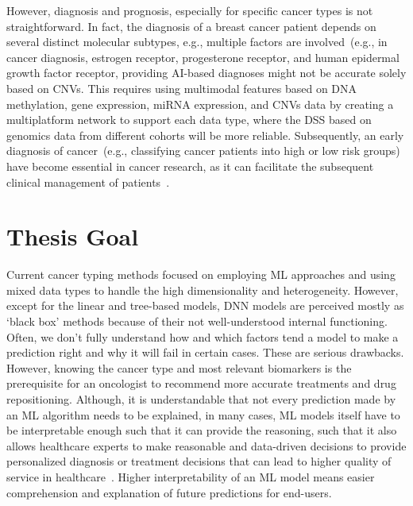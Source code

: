 \hspace*{3.5mm} However, diagnosis and prognosis, especially for specific cancer types is not straightforward. In fact, the diagnosis of a breast cancer patient depends on several distinct molecular subtypes, e.g., multiple factors are involved~(e.g., in cancer diagnosis, estrogen receptor, progesterone receptor, and human epidermal growth factor receptor, providing AI-based diagnoses might not be accurate solely based on CNVs. This requires using multimodal features based on DNA methylation, gene expression, miRNA expression, and CNVs data by creating a multiplatform network to support each data type, where the DSS based on genomics data from different cohorts will be more reliable. Subsequently, an early diagnosis of cancer~(e.g., classifying cancer patients into high or low risk groups) have become essential in cancer research, as it can facilitate the subsequent clinical management of patients~\cite{kourou2015machine}.  

\section{Thesis Goal} \label{thesis_goal}
Current cancer typing methods focused on employing ML approaches and using mixed data types to handle the high dimensionality and heterogeneity. However, except for the linear and tree-based models, DNN models are perceived mostly as `black box' methods because of their not well-understood internal functioning. Often, we don't fully understand how and which factors tend a model to make a prediction right and why it will fail in certain cases. These are serious drawbacks. However, knowing the cancer type and most relevant biomarkers is the prerequisite for an oncologist to recommend more accurate treatments and drug repositioning. 
Although, it is understandable that not every prediction made by an ML algorithm needs to be explained, in many cases, ML models itself have to be interpretable enough such that it can provide the reasoning, such that it also allows healthcare experts to make reasonable and data-driven decisions to provide personalized diagnosis or treatment decisions that can lead to higher quality of service in healthcare~\cite{stiglic2020interpretability}.
Higher interpretability of an ML model means easier comprehension and explanation of future predictions for end-users. 

